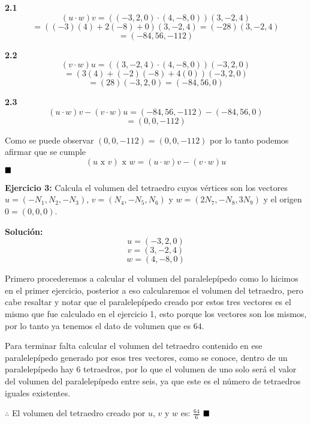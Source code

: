 \documentclass{article}
\begin{document}
\hspace*{-3cm}\begin{minipage}[c]{0.5cm}
   \textbf{2.1}
   $$(u\cdot w)v = ((-3, 2, 0)\cdot (4,-8,0))(3,-2, 4)$$
   $$= ((-3)(4)+ 2(-8)+ 0)(3,-2, 4) = (-28)(3,-2,4)$$
   $$=(-84, 56, -112)$$
\end{minipage}\hspace*{8cm} \begin{minipage}[c]{0.5cm}
   \textbf{2.2}
   $$(v\cdot w)u= ((3,-2, 4)\cdot(4,-8,0))(-3, 2, 0)$$
   $$=(3(4)+(-2)(-8)+4(0))(-3, 2, 0)$$
   $$=(28)(-3, 2, 0) = (-84, 56 , 0)$$
\end{minipage}
\vspace{10pt}


\begin{minipage}[c]{0.5cm}
   \textbf{2.3}
   $$(u\cdot w)v -(v\cdot w)u = (-84, 56, -112)- (-84, 56 , 0)$$
   $$= (0, 0, -112)$$
\end{minipage}
\vspace{10pt}


Como se puede observar $(0, 0, -112) = (0, 0, -112)$ por lo tanto podemos afirmar que se cumple
$$(u \text{ x } v)\text{ x }w = (u\cdot w)v -(v\cdot w)u$$
$\hfill\blacksquare$
\vspace*{10pt}


\textbf{Ejercicio 3:} Calcula el volumen del tetraedro cuyos vértices son los vectores $u = (-N_1,N_2,-N_3)$, $v = (N_4, -N_5,N_6)$ y
$w= (2N_7, -N_8, 3N_9)$ y el origen $0 =(0,0,0)$.
\vspace{10pt}


\textbf{Solución:}
$$u = (-3,2,0)$$
$$v = (3, -2,4)$$
$$w= (4, -8, 0)$$


Primero procederemos a calcular el volumen del paralelepípedo como lo hicimos en el primer ejercicio, posterior a eso calcularemos el volumen del
tetraedro, pero cabe resaltar y notar que el paralelepípedo creado por estos tres vectores es el mismo que fue calculado en el ejercicio 1, esto
porque los vectores son los mismos, por lo tanto ya tenemos el dato de volumen que es $64$.


Para terminar falta calcular el volumen del tetraedro contenido en ese paralelepípedo generado por esos tres vectores, como se conoce, dentro de un
paralelepípedo hay 6 tetraedros, por lo que el volumen de uno solo será el valor del volumen del paralelepípedo entre seis, ya que este es el número de
tetraedros iguales existentes.


$\therefore$ El volumen del tetraedro creado por $u$, $v$ y $w$ es: $\frac{64}{6}$
$\hfill\blacksquare$
\vspace{10pt}
\end{document}

